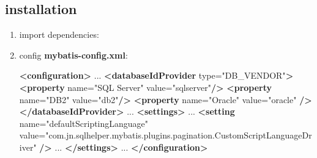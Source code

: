 \documentclass[
]{book}
\newenvironment{Shaded}{\begin{snugshade}}{\end{snugshade}}
\newcommand{\KeywordTok}[1]{\textcolor[rgb]{0.13,0.29,0.53}{\textbf{#1}}}
\newcommand{\NormalTok}[1]{#1}
\newcommand{\OtherTok}[1]{\textcolor[rgb]{0.56,0.35,0.01}{#1}}
\newcommand{\StringTok}[1]{\textcolor[rgb]{0.31,0.60,0.02}{#1}}
\begin{document}
\hypertarget{sqlhelper_mybatis_installation}{%
\subsection{installation}\label{sqlhelper_mybatis_installation}}

\begin{enumerate}
\def\labelenumi{\arabic{enumi}.}
\item
  import dependencies:

\begin{Shaded}
\end{Shaded}
\item
  config \textbf{mybatis-config.xml}:

\begin{Shaded}
\begin{Highlighting}[]
\KeywordTok{<configuration>}
\NormalTok{     ...}
     \KeywordTok{<databaseIdProvider}\OtherTok{ type=}\StringTok{"DB_VENDOR"}\KeywordTok{>}
         \KeywordTok{<property}\OtherTok{ name=}\StringTok{"SQL Server"}\OtherTok{ value=}\StringTok{"sqlserver"}\KeywordTok{/>}
         \KeywordTok{<property}\OtherTok{ name=}\StringTok{"DB2"}\OtherTok{ value=}\StringTok{"db2"}\KeywordTok{/>}
         \KeywordTok{<property}\OtherTok{ name=}\StringTok{"Oracle"}\OtherTok{ value=}\StringTok{"oracle"} \KeywordTok{/>}
     \KeywordTok{</databaseIdProvider>}
\NormalTok{     ...}
     \KeywordTok{<settings>}
\NormalTok{         ...}
         \KeywordTok{<setting}\OtherTok{ name=}\StringTok{"defaultScriptingLanguage"}\OtherTok{ value=}\StringTok{"com.jn.sqlhelper.mybatis.plugins.pagination.CustomScriptLanguageDriver"} \KeywordTok{/>}
\NormalTok{         ...}
     \KeywordTok{</settings>}
\NormalTok{         ...}
\KeywordTok{</configuration>}


\end{Highlighting}
\end{Shaded}
\end{enumerate}
\end{document}
